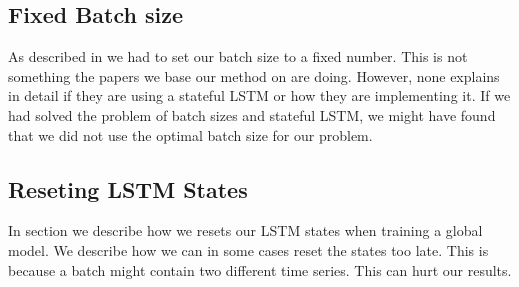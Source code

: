 \subsection{Fixed Batch size}
As described in  we had to set our batch size to
a fixed number. This is not something the papers we base our method on are doing. However,
none explains in detail if they are using a stateful LSTM or how they are implementing it.
If we had solved the problem of batch sizes and stateful LSTM, we might have found that we did not
use the optimal batch size for our problem.

\subsection{Reseting LSTM States}
In section  we describe how we resets our LSTM states
when training a global model. We describe how we can
in some cases reset the states too late. This is because a batch might contain two different time series.
This can hurt our results.

